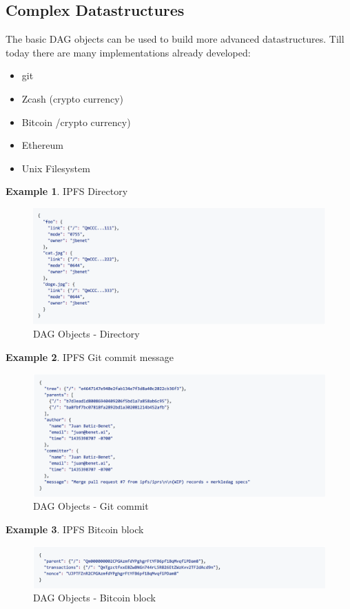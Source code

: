 \documentclass[a4paper,11pt, oneside]{report}
\theoremstyle{definition}
\newtheorem{exmp}{Example}[subsection]
\begin{document}
\subsection{Complex Datastructures}
The basic DAG objects can be used to build more advanced datastructures. Till today there are many implementations already developed:
\begin{itemize}
\item git
\item Zcash (crypto currency)
\item Bitcoin /crypto currency)
\item Ethereum
\item Unix Filesystem
\end{itemize}
\begin{exmp}IPFS Directory
\begin{figure}[H]
\centering
\includegraphics[width=\textwidth]{img/dag-object-dir.png}
\caption[DAG Directory]{DAG Objects - Directory}
\end{figure}
\end{exmp}
\newpage
\begin{exmp}IPFS Git commit message
\begin{figure}[H]
\centering
\includegraphics[width=\textwidth]{img/dag-object-gitcommit.png}
\caption[DAG Objects commit]{DAG Objects - Git commit}
\end{figure}
\end{exmp}
\begin{exmp}IPFS Bitcoin block
\begin{figure}[H]
\centering
\includegraphics[width=\textwidth]{img/dag-object-blockchain.png}
\caption[DAG Bitcoin block]{DAG Objects - Bitcoin block}
\end{figure}
\end{exmp}
\end{document}
